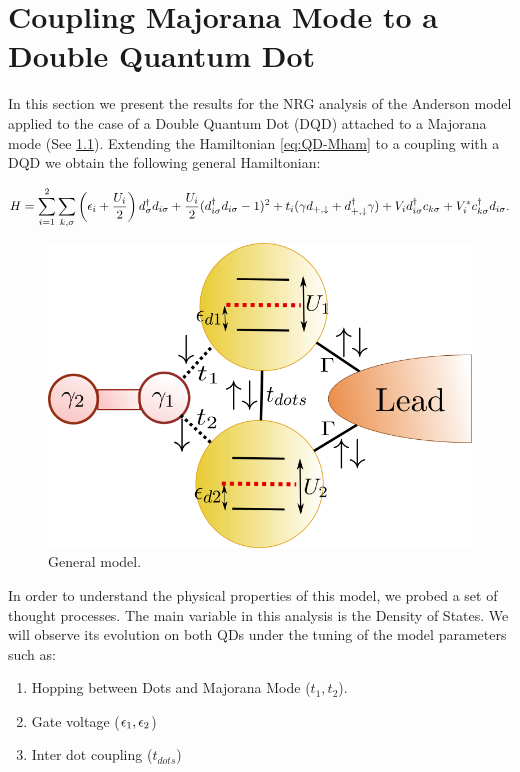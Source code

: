 \chapter{Coupling Majorana Mode to a Double Quantum Dot }
In this section we present the results for the NRG analysis of the Anderson model applied to the case of a Double Quantum Dot (DQD) attached to a Majorana mode (See \ref{fig:GeneralModel}). Extending the  Hamiltonian \eqref{eq:QD-Mham} to a coupling with a DQD we obtain the following general Hamiltonian:   

\begin{equation}
H =\sum_{i=1}^2\sum_{k,\sigma}\left(\epsilon_{i}+\frac{U_i}{2}\right)d_{\sigma}^{\dagger}d_{i\sigma}+ \frac{U_i}{2}(d_{i \sigma}^{\dagger}d_{i \sigma}-1)^{2} + t_i(\gamma d_{+,\downarrow}+d^\dagger_{+,\downarrow}\gamma) + V_id^\dagger_{i\sigma}c_{k\sigma}+V_i^* c^\dagger_{k\sigma}d_{i\sigma}.
\label{General model}
\end{equation}



\begin{figure}[h]
\centering
\includegraphics[scale=0.4]{IMAGES/GenModel.png}
\caption{\label{fig:GeneralModel}General model.} 
\end{figure}



In order to understand the physical properties of this model, we probed a set of thought processes. The main variable in this analysis is the Density of States.  We  will observe its evolution on both QDs under the tuning of the model parameters such as:
\begin{enumerate}
    \item Hopping between Dots and Majorana Mode ($t_1 , t_2$). 
    \item Gate voltage ($\epsilon_{1} , \epsilon_{2} $)
    \item Inter dot coupling ($t_{dots}$)
\end{enumerate}


